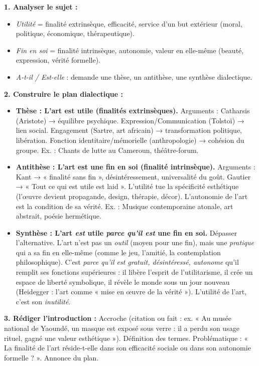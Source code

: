 \documentclass[11pt]{article}
\begin{document}
\begin{methode}
\textbf{1. Analyser le sujet :}
\begin{itemize}
    \item \emph{Utilité} = finalité extrinsèque, efficacité, service d'un but extérieur (moral, politique, économique, thérapeutique).
    \item \emph{Fin en soi} = finalité intrinsèque, autonomie, valeur en elle-même (beauté, expression, vérité formelle).
    \item \emph{A-t-il / Est-elle} : demande une thèse, un antithèse, une synthèse dialectique.
\end{itemize}

\textbf{2. Construire le plan dialectique :}
\begin{itemize}
    \item \textbf{Thèse : L'art est utile (finalités extrinsèques).} Arguments : Catharsis (Aristote) → équilibre psychique. Expression/Communication (Tolstoï) → lien social. Engagement (Sartre, art africain) → transformation politique, libération. Fonction identitaire/mémorielle (anthropologie) → cohésion du groupe. Ex. : Chants de lutte au Cameroun, théâtre-forum.
    \item \textbf{Antithèse : L'art est une fin en soi (finalité intrinsèque).} Arguments : Kant → « finalité sans fin », désintéressement, universalité du goût. Gautier → « Tout ce qui est utile est laid ». L'utilité tue la spécificité esthétique (l'œuvre devient propagande, design, thérapie, décor). L'autonomie de l'art est la condition de sa vérité. Ex. : Musique contemporaine atonale, art abstrait, poésie hermétique.
    \item \textbf{Synthèse : L'art \emph{est} utile \emph{parce qu'il est} une fin en soi.} Dépasser l'alternative. L'art n'est pas un \emph{outil} (moyen pour une fin), mais une \emph{pratique} qui a sa fin en elle-même (comme le jeu, l'amitié, la contemplation philosophique). C'est \emph{parce qu'il est gratuit, désintéressé, autonome} qu'il remplit ses fonctions supérieures : il libère l'esprit de l'utilitarisme, il crée un espace de liberté symbolique, il révèle le monde sous un jour nouveau (Heidegger : l'art comme « mise en œuvre de la vérité »). L'utilité de l'art, c'est son \emph{inutilité}.
\end{itemize}

\textbf{3. Rédiger l'introduction :} Accroche (citation ou fait : ex. « Au musée national de Yaoundé, un masque est exposé sous verre : il a perdu son usage rituel, gagné une valeur esthétique »). Définition des termes. Problématique : « La finalité de l'art réside-t-elle dans son efficacité sociale ou dans son autonomie formelle ? ». Annonce du plan.
\end{methode}
\end{document}
